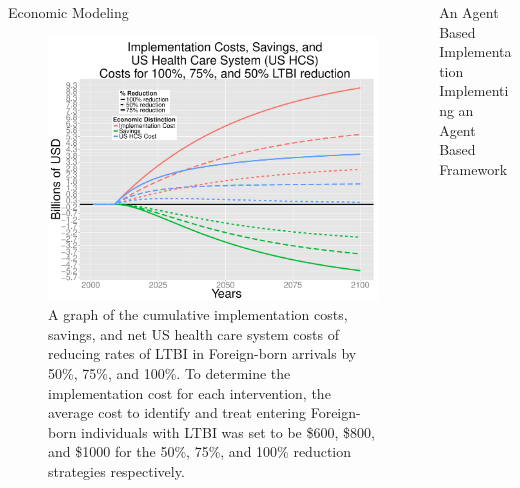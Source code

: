 \documentclass[final]{beamer}
\begin{document}
\begin{frame}
\begin{columns}
\begin{column}{.3\textwidth}
\begin{block}{Economic Modeling}
        \begin{figure}[h]
          \begin{center}
            \includegraphics[scale=1]{EnLTBIRedGroupCost.pdf}
          \end{center}
          \caption{A graph of the cumulative implementation costs, savings, and 
                       net US health care system costs of reducing rates of LTBI in
                       Foreign-born arrivals by 50\%, 75\%, and 100\%.  To determine the 
                       implementation cost for each intervention, the average cost
                       to identify and treat entering Foreign-born individuals with LTBI
                       was set to be \$600, \$800, and \$1000 for the 50\%, 75\%, 
                       and 100\% reduction strategies respectively.}
          \label{fig:redEnLTBI_costs}
        \end{figure}
      \end{block}
    \end{column}
    \begin{column}{.3\textwidth}
      \begin{block}{An Agent Based Implementation}
        Implementing an Agent Based Framework
      \end{block}
    \end{column}
  \end{columns}
\end{frame}
\end{document}
